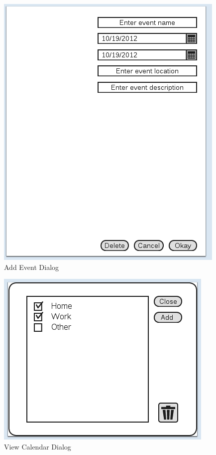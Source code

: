 \documentclass{article}
\begin{document}
\begin{figure}[hb]
\centering
\includegraphics[scale=0.7]{CMCLGDREvent.png}
\caption{Add Event Dialog}
\label{fig:addevent}
\end{figure}

\begin{figure}[hb]
\centering
\includegraphics[scale=1]{CMCLGDRViewCalendar.png}
\caption{View Calendar Dialog}
\label{fig:viewcal}
\end{figure}
\end{document}
